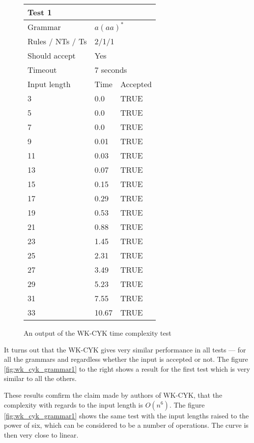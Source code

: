 \begin{figure}[h]
\centering
  \caption{An output of the WK-CYK time complexity test}
  \label{tab:input_compl_test}
\begin{tabular}{ |l|l|l|  }
  \hline
  \multicolumn{3}{|l|}{Test 1} \\
  \hline
  Grammar & \multicolumn{2}{|l|}{$a(aa)^*$} \\
  Rules / NTs / Ts & \multicolumn{2}{|l|}{2/1/1} \\
  Should accept & \multicolumn{2}{|l|}{Yes} \\
  Timeout & \multicolumn{2}{|l|}{7 seconds} \\
  \hline
  Input length & Time & Accepted \\
  \hline
  3 & 0.0 & TRUE \\
  5 & 0.0 & TRUE \\
  7 & 0.0 & TRUE \\
  9 & 0.01 & TRUE \\
  11 & 0.03 &  TRUE \\
  13 & 0.07 &  TRUE \\
  15 & 0.15 &  TRUE \\
  17 & 0.29 &  TRUE \\
  19 & 0.53 &  TRUE \\
  21 & 0.88 &  TRUE \\
  23 & 1.45 &  TRUE \\
  25 & 2.31 &  TRUE \\
  27 & 3.49 &  TRUE \\
  29 & 5.23 & TRUE \\
  31 & 7.55 & TRUE \\
  33 & 10.67 & TRUE \\

  \hline
\end{tabular}
\end{figure}

It turns out that the WK-CYK gives very similar performance in all tests --- for all the grammars and regardless whether the input is accepted or not. The figure \ref{fig:wk_cyk_grammar1} to the right shows a result for the first test which is very similar to all the others.

These results comfirm the claim made by authors of WK-CYK, that the complexity with regards to the input length is $O(n^6)$. The figure \ref{fig:wk_cyk_grammar1} shows the same test with the input lengths raised to the power of six, which can be considered to be a number of operations. The curve is then very close to linear.

